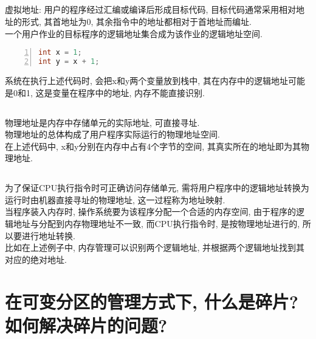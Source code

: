 \documentclass[a4paper, 12pt, notitlepage]{article}
\begin{document}
\subsection{}

	虚拟地址: 用户的程序经过汇编或编译后形成目标代码, 目标代码通常采用相对地址的形式, 其首地址为0, 其余指令中的地址都相对于首地址而编址. \\
	
	一个用户作业的目标程序的逻辑地址集合成为该作业的逻辑地址空间. \\
	
\begin{lstlisting}[frame=shadowbox, numbers=left, language=C]
int x = 1;
int y = x + 1;
\end{lstlisting}

	系统在执行上述代码时, 会把x和y两个变量放到栈中, 其在内存中的逻辑地址可能是0和1, 这是变量在程序中的地址, 内存不能直接识别. 

\subsection{}
	
	物理地址是内存中存储单元的实际地址, 可直接寻址. \\
	
	物理地址的总体构成了用户程序实际运行的物理地址空间. \\
	
	在上述代码中, x和y分别在内存中占有4个字节的空间, 其真实所在的地址即为其物理地址. 

\subsection{}
	
	为了保证CPU执行指令时可正确访问存储单元, 需将用户程序中的逻辑地址转换为运行时由机器直接寻址的物理地址, 这一过程称为地址映射. \\
	
	当程序装入内存时, 操作系统要为该程序分配一个合适的内存空间, 由于程序的逻辑地址与分配到内存物理地址不一致, 而CPU执行指令时, 是按物理地址进行的, 所以要进行地址转换. \\
	
	比如在上述例子中, 内存管理可以识别两个逻辑地址, 并根据两个逻辑地址找到其对应的绝对地址. 

\section{在可变分区的管理方式下, 什么是碎片? 如何解决碎片的问题?}
\end{document}
